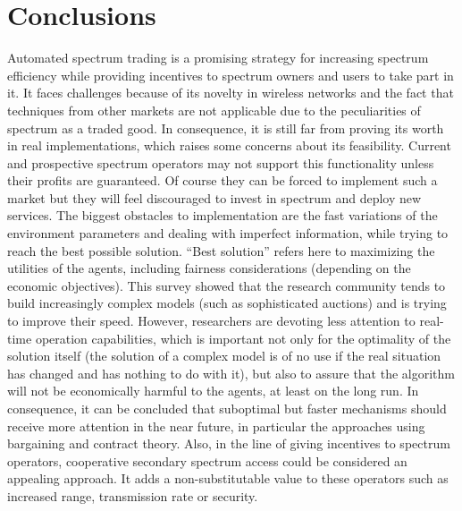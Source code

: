 \section{Conclusions}
\label{sec:Conclusions}

Automated spectrum trading is a promising strategy for increasing spectrum efficiency while providing incentives to spectrum owners and users to take part in it.
It faces challenges because of its novelty in wireless networks and the fact that techniques from other markets are not applicable due to the peculiarities of spectrum as a traded good.
In consequence, it is still far from proving its worth in real implementations, which raises some concerns about its feasibility.
Current and prospective spectrum operators may not support this functionality unless their profits are guaranteed. Of course they can be forced to implement such a market but they will feel discouraged to invest in spectrum and deploy new services. The biggest obstacles to implementation are the fast variations of the environment parameters and dealing with imperfect information, while trying to reach the best possible solution. ``Best solution'' refers here to maximizing the utilities of the agents, including fairness considerations (depending on the economic objectives). 
This survey showed that the research community tends to build increasingly complex models (such as sophisticated auctions) and is trying to improve their speed. However, researchers are devoting less attention to real-time operation capabilities, which is important not only for the optimality of the solution itself (the solution of a complex model is of no use if the real situation has changed and has nothing to do with it), but also to assure that the algorithm will not be economically harmful to the agents, at least on the long run. In consequence, it can be concluded that suboptimal but faster mechanisms should receive more attention in the near future, in particular the approaches using bargaining and contract theory. 
Also, in the line of giving incentives to spectrum operators, cooperative secondary spectrum access could be considered an appealing approach. It adds a non-substitutable value to these operators such as increased range, transmission rate or security.